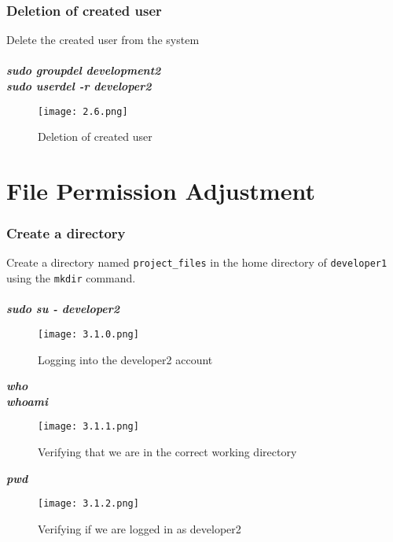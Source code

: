 \documentclass[12pt]{article}
\begin{document}
\subsubsection{Deletion of created user}
Delete the created user from the system
\\ \\ \textbf{\textit {sudo groupdel development2}}
\\ \textbf{\textit {sudo userdel -r developer2}}
\begin{figure}[H] %
    \centering
    \texttt{[image: 2.6.png]}
    \caption{Deletion of created user}
    \label{fig:labelname}
\end{figure}

\section{File Permission Adjustment}

\subsubsection{Create a directory}
Create a directory named \texttt{project\_files} in the home directory of \texttt{developer1} using the \texttt{mkdir} command.
\\ \\ \textbf{\textit {sudo su - developer2}}
\begin{figure}[H] %
    \centering
    \texttt{[image: 3.1.0.png]}
    \caption{Logging into the developer2 account}
    \label{fig:labelname}
\end{figure}

\textbf{\textit {who}}
\\ \textbf{\textit {whoami}}
\begin{figure}[H] %
    \centering
    \texttt{[image: 3.1.1.png]}
    \caption{Verifying that we are in the correct working directory}
    \label{fig:labelname}
\end{figure}

\textbf{\textit {pwd}}
\begin{figure}[H] %
    \centering
    \texttt{[image: 3.1.2.png]}
    \caption{Verifying if we are logged in as developer2}
    \label{fig:labelname}
\end{figure}
\end{document}
